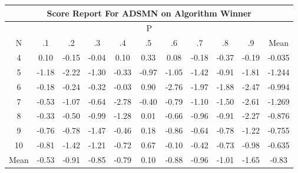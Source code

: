 \documentclass[11pt,a4paper]{report}
\begin{document}
\begin{longtable}{ | c || c | c | c | c | c | c | c | c | c || c |}
\hline
\multicolumn{11}{|c|}{ Score Report For ADSMN on Algorithm Winner} \\
\hline
\multicolumn{11}{|c|}{ P } \\
\hline
N & .1 & .2 & .3 & .4 & .5 & .6 & .7 & .8 & .9 & Mean\\
 \hline
 \hline
 \endhead
  4 &  \cellcolor[HTML]{FFFFFF} 0.10 &  \cellcolor[HTML]{FFFFFF} -0.15 &  \cellcolor[HTML]{FFFFFF} -0.04 &  \cellcolor[HTML]{FFFFFF} 0.10 &  \cellcolor[HTML]{F7F7FF} 0.33 &  \cellcolor[HTML]{FFFFFF} 0.08 &  \cellcolor[HTML]{FFF7F7} -0.18 &  \cellcolor[HTML]{FFF7F7} -0.37 &  \cellcolor[HTML]{FFF7F7} -0.19 & -0.035 \\
  5 &  \cellcolor[HTML]{FFDFDF} -1.18 &  \cellcolor[HTML]{FFC7C7} -2.22 &  \cellcolor[HTML]{FFDFDF} -1.30 &  \cellcolor[HTML]{FFF7F7} -0.33 &  \cellcolor[HTML]{FFE7E7} -0.97 &  \cellcolor[HTML]{FFE7E7} -1.05 &  \cellcolor[HTML]{FFDFDF} -1.42 &  \cellcolor[HTML]{FFE7E7} -0.91 &  \cellcolor[HTML]{FFCFCF} -1.81 & -1.244 \\
  6 &  \cellcolor[HTML]{FFF7F7} -0.18 &  \cellcolor[HTML]{FFF7F7} -0.24 &  \cellcolor[HTML]{FFF7F7} -0.32 &  \cellcolor[HTML]{FFFFFF} -0.03 &  \cellcolor[HTML]{E7E7FF} 0.90 &  \cellcolor[HTML]{FFB7B7} -2.76 &  \cellcolor[HTML]{FFCFCF} -1.97 &  \cellcolor[HTML]{FFCFCF} -1.88 &  \cellcolor[HTML]{FFBFBF} -2.47 & -0.994 \\
  7 &  \cellcolor[HTML]{FFEFEF} -0.53 &  \cellcolor[HTML]{FFE7E7} -1.07 &  \cellcolor[HTML]{FFEFEF} -0.64 &  \cellcolor[HTML]{FFB7B7} -2.78 &  \cellcolor[HTML]{FFF7F7} -0.40 &  \cellcolor[HTML]{FFEFEF} -0.79 &  \cellcolor[HTML]{FFE7E7} -1.10 &  \cellcolor[HTML]{FFD7D7} -1.50 &  \cellcolor[HTML]{FFBFBF} -2.61 & -1.269 \\
  8 &  \cellcolor[HTML]{FFF7F7} -0.33 &  \cellcolor[HTML]{FFEFEF} -0.50 &  \cellcolor[HTML]{FFE7E7} -0.99 &  \cellcolor[HTML]{FFDFDF} -1.28 &  \cellcolor[HTML]{FFFFFF} 0.01 &  \cellcolor[HTML]{FFEFEF} -0.66 &  \cellcolor[HTML]{FFE7E7} -0.96 &  \cellcolor[HTML]{FFE7E7} -0.91 &  \cellcolor[HTML]{FFC7C7} -2.27 & -0.876 \\
  9 &  \cellcolor[HTML]{FFEFEF} -0.76 &  \cellcolor[HTML]{FFEFEF} -0.78 &  \cellcolor[HTML]{FFD7D7} -1.47 &  \cellcolor[HTML]{FFF7F7} -0.46 &  \cellcolor[HTML]{F7F7FF} 0.18 &  \cellcolor[HTML]{FFE7E7} -0.86 &  \cellcolor[HTML]{FFEFEF} -0.64 &  \cellcolor[HTML]{FFEFEF} -0.78 &  \cellcolor[HTML]{FFDFDF} -1.22 & -0.755 \\
  10 &  \cellcolor[HTML]{FFE7E7} -0.81 &  \cellcolor[HTML]{FFDFDF} -1.42 &  \cellcolor[HTML]{FFDFDF} -1.21 &  \cellcolor[HTML]{FFEFEF} -0.72 &  \cellcolor[HTML]{EFEFFF} 0.67 &  \cellcolor[HTML]{FFFFFF} -0.10 &  \cellcolor[HTML]{FFF7F7} -0.42 &  \cellcolor[HTML]{FFEFEF} -0.73 &  \cellcolor[HTML]{FFE7E7} -0.98 & -0.635 \\
 \hline
 \hline
Mean &  \cellcolor[HTML]{FFEFEF} -0.53 &  \cellcolor[HTML]{FFE7E7} -0.91 &  \cellcolor[HTML]{FFE7E7} -0.85 &  \cellcolor[HTML]{FFEFEF} -0.79 &  \cellcolor[HTML]{FFFFFF} 0.10 &  \cellcolor[HTML]{FFE7E7} -0.88 &  \cellcolor[HTML]{FFE7E7} -0.96 &  \cellcolor[HTML]{FFE7E7} -1.01 &  \cellcolor[HTML]{FFD7D7} -1.65 &  \cellcolor[HTML]{FFE7E7} -0.83
\end{longtable}
\end{document}
